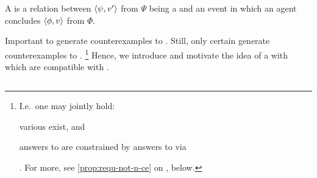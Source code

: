 \chapter{}
\label{cha:requs}

\begin{note}
  A \requ{} is a relation between \(\langle \psi, v' \rangle\) from \(\Psi\) being a \fc{} and an event in which an agent concludes \(\langle \phi, v \rangle\) from \(\Phi\).
\end{note}

\begin{note}
  Important to generate counterexamples to \issueConstraint{}.
  Still, only certain  generate counterexamples to \issueConstraint{}.%
  \footnote{
    I.e.\ one may jointly hold:
    \begin{enumerate*}[label=(\alph*)]
    \item
      various  exist, and
    \item
      answers to \qWhyV{} are constrained by answers to \qHowV{} via \issueConstraint{}
    \end{enumerate*}%
    .
    For more, see \autoref{prop:requ-not-n-ce} on , below.
  }
  Hence, we introduce and motivate the idea of a  with  which are compatible with \issueConstraint{}.
\end{note}

\section{}
\label{cha:requs:requs}

